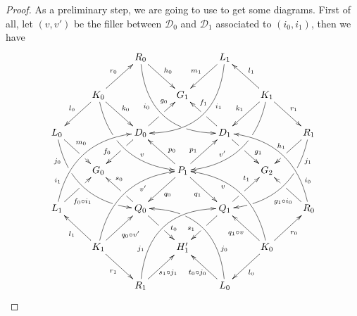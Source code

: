 \documentclass[a4paper]{article}
\newcommand{\dder}[1]{\mathscr{#1}}
\theoremstyle{definition}
\begin{document}
\begin{proof}  As a preliminary step, we are going to use  to get some diagrams.  First of all, let $(v,v')$ be the filler between $\dder{D}_0$ and $\dder{D}_1$ associated to $(i_0, i_1)$, then we have
	\[\xymatrix{&&R_0 \ar@/_1cm/[ddrr]_(.35){i_0}|(.7)\hole \ar[dr]^{h_0}&& L_1\ar@/^1cm/[ddll]^(.35){i_1}  \ar[dl]_{m_1}\\&K_0\ar[dr]^{k_0}\ar[dl]_{l_0} \ar@/_.8cm/[ddrr]|(.36)\hole^(.65){v}\ar[ur]^{r_0}&& G_1 && K_1 \ar@/^.8cm/[ddll]|(.36)\hole_(.65){v'}\ar[dl]_{k_1}\ar[lu]_{l_1} \ar[dr]^{r_1}\\L_0 \ar@/_.8cm/[ddrr]_(.2){j_0}|(.31)\hole|(.81)\hole \ar[dr]^(.4){m_0}|(.61)\hole && D_0 \ar[dl]|(.4)\hole_(.65){f_0}\ar[ur]|(.5)\hole^(.7){g_0}&&D_1 \ar[dr]|(.4)\hole^(.65){g_1} \ar[ul]|(.5)\hole_(.65){f_1}&&R_1\ar@/^.8cm/[ddll]^(.2){j_1}|(.31)\hole|(.81)\hole\ar[dl]_{h_1}|(.6)\hole\\&G_0 &&P_1\ar[dr]_{q_1} \ar[dl]^{q_0}\ar[ur]^(.4){p_1}\ar[ul]_(.4){p_0}&&G_2\\L_1 \ar@/^.8cm/[uurr]^(.2){i_1} \ar[ur]_(.35){f_0\circ i_1}|(.61)\hole&&Q_0 \ar[ul]|(.4)\hole_(.65){s_0}\ar[dr]|(.5)\hole^(.65){t_0} &&Q_1\ar[ur]|(.4)\hole^(.65){t_1} \ar[dl]|(.5)\hole_(.65){s_1} && R_0  \ar[ul]^(.35){g_1\circ i_0}|(.61)\hole\ar@/_.8cm/[uull]_(.2){i_0}\\&K_1 \ar[ur]_{q_0\circ v'} \ar[dr]_{r_1} \ar[ul]^{l_1}\ar@/^.8cm/[uurr]_(.65){v'}&&H'_1&& K_0 \ar[ur]_{r_0} \ar[ul]^{q_1\circ v} \ar[dl]^{l_0} \ar@/_.8cm/[uull]^(.65){v}\\&& R_1 \ar[ur]_{\hspace{-5pt}s_1\circ j_1}\ar@/^1cm/[uurr]^(.25){j_1}&& L_0 \ar[ul]^{t_0\circ j_0\hspace{-5pt}} \ar@/_1cm/[uull]_(.25){j_0} |(.69)\hole }\]
	

\end{proof}
\end{document}
